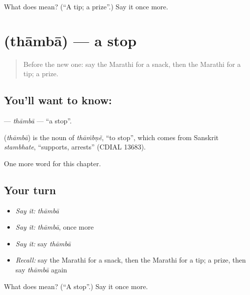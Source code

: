 \begin{tcolorbox}[breakable,colback=teal!4,colframe=teal!35!black,title={Before you move on}]
What does  mean? (\textquotedblleft{}A tip; a prize\textquotedblright{}.) Say it once more.
\end{tcolorbox}
\section[\texorpdfstring{\mr{थांबा} (thāmbā)}{थांबा (thāmbā)}]{ (thāmbā) — a stop}

\label{lesson:MR-C208-thamba}



\begin{quote}
Before the new one: say the Marathi for a snack, then the Marathi for a tip; a prize.
\end{quote}

\subsection*{You'll want to know: }
\textbf{} — \emph{thāmbā} — \textquotedblleft{}a stop\textquotedblright{}.

\begin{cousinweb}
\textbf{} (\emph{thāmbā}) is the noun of \emph{thāṁbṇẽ}, \textquotedblleft{}to stop\textquotedblright{}, which comes from Sanskrit \emph{stambhate}, \textquotedblleft{}supports, arrests\textquotedblright{} (CDIAL 13683).
\end{cousinweb}

\begin{grammarlens}[title={What you've built}]
One more word for this chapter.
\end{grammarlens}

\subsection*{Your turn}
\begin{itemize}
\raggedright
  \item \emph{Say it:} \emph{thāmbā}
  \item \emph{Say it:} \emph{thāmbā}, once more
  \item \emph{Say it:} say \emph{thāmbā}
  \item \emph{Recall:} say the Marathi for a snack, then the Marathi for a tip; a prize, then say \emph{thāmbā} again
\end{itemize}

\begin{tcolorbox}[breakable,colback=teal!4,colframe=teal!35!black,title={Before you move on}]
What does  mean? (\textquotedblleft{}A stop\textquotedblright{}.) Say it once more.
\end{tcolorbox}
